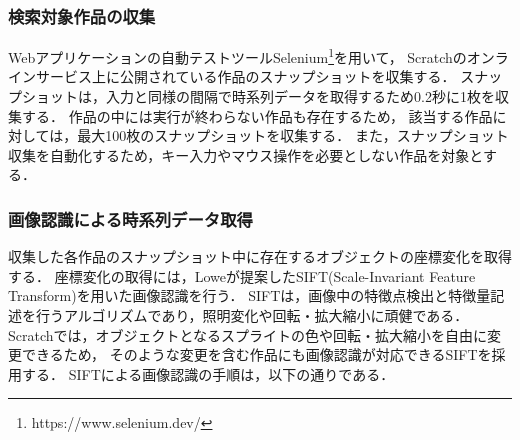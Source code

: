\documentclass[11pt]{jreport}
\begin{document}
\subsubsection{検索対象作品の収集}
\label{collection}
Webアプリケーションの自動テストツールSelenium\footnote{https://www.selenium.dev/}を用いて，
Scratchのオンラインサービス上に公開されている作品のスナップショットを収集する．
スナップショットは，入力と同様の間隔で時系列データを取得するため0.2秒に1枚を収集する．
作品の中には実行が終わらない作品も存在するため，
該当する作品に対しては，最大100枚のスナップショットを収集する．
また，スナップショット収集を自動化するため，キー入力やマウス操作を必要としない作品を対象とする．

\subsubsection{画像認識による時系列データ取得}
収集した各作品のスナップショット中に存在するオブジェクトの座標変化を取得する．
座標変化の取得には，Loweが提案したSIFT(Scale-Invariant Feature Transform)\cite{sift}を用いた画像認識を行う．
SIFTは，画像中の特徴点検出と特徴量記述を行うアルゴリズムであり，照明変化や回転・拡大縮小に頑健である．
Scratchでは，オブジェクトとなるスプライトの色や回転・拡大縮小を自由に変更できるため，
そのような変更を含む作品にも画像認識が対応できるSIFTを採用する．
SIFTによる画像認識の手順は，以下の通りである．
\end{document}
